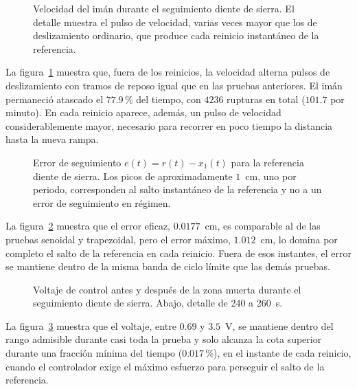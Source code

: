 \FloatBarrier

\begin{figure}[ht]
    \centering
    
    \caption[Seguimiento diente de sierra: velocidad]{Velocidad del imán durante el seguimiento diente de sierra. El detalle muestra el pulso de velocidad, varias veces mayor que los de deslizamiento ordinario, que produce cada reinicio instantáneo de la referencia.}
    \label{fig:diente_vel}
\end{figure}

La figura~\ref{fig:diente_vel} muestra que, fuera de los reinicios, la velocidad alterna pulsos de deslizamiento con tramos de reposo igual que en las pruebas anteriores. El imán permaneció atascado el $77.9$\,\% del tiempo, con $4236$ rupturas en total ($101.7$ por minuto). En cada reinicio aparece, además, un pulso de velocidad considerablemente mayor, necesario para recorrer en poco tiempo la distancia hasta la nueva rampa.

\FloatBarrier

\begin{figure}[ht]
    \centering
    
    \caption[Seguimiento diente de sierra: error]{Error de seguimiento $e(t)=r(t)-x_1(t)$ para la referencia diente de sierra. Los picos de aproximadamente $1$~cm, uno por periodo, corresponden al salto instantáneo de la referencia y no a un error de seguimiento en régimen.}
    \label{fig:diente_error}
\end{figure}

La figura~\ref{fig:diente_error} muestra que el error eficaz, $0.0177$~cm, es comparable al de las pruebas senoidal y trapezoidal, pero el error máximo, $1.012$~cm, lo domina por completo el salto de la referencia en cada reinicio. Fuera de esos instantes, el error se mantiene dentro de la misma banda de ciclo límite que las demás pruebas.

\FloatBarrier

\begin{figure}[ht]
    \centering
    
    \caption[Seguimiento diente de sierra: señal de control]{Voltaje de control antes y después de la zona muerta durante el seguimiento diente de sierra. Abajo, detalle de 240 a 260~s.}
    \label{fig:diente_ctrl}
\end{figure}

La figura~\ref{fig:diente_ctrl} muestra que el voltaje, entre $0.69$ y $3.5$~V, se mantiene dentro del rango admisible durante casi toda la prueba y solo alcanza la cota superior durante una fracción mínima del tiempo ($0.017$\,\%), en el instante de cada reinicio, cuando el controlador exige el máximo esfuerzo para perseguir el salto de la referencia.

